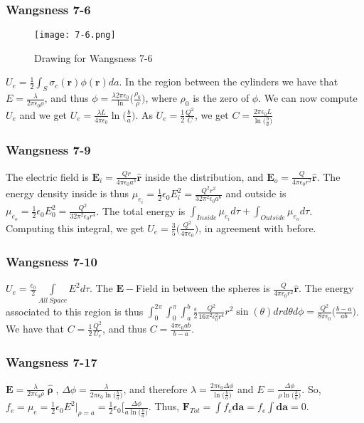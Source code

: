 \documentclass[crop=false,class=article,oneside]{standalone}
\begin{document}
        \subsubsection{Wangsness 7-6}
        \begin{figure}[htbp]
            \centering
            {\texttt{[image: 7-6.png]}}
            \caption{Drawing for Wangsness 7-6}
        \end{figure}
        $U_e = \frac{1}{2}\int_{S}\sigma_c(\mathbf{r})\phi(\mathbf{r})da$. In the region between the cylinders we have that $E = \frac{\lambda}{2\pi \epsilon_0 \rho}$, and thus $\phi= \frac{\lambda 2\pi \epsilon_0}\ln\big(\frac{\rho_0}{\rho}\big)$, where $\rho_0$ is the zero of $\phi$. We can now compute $U_e$ and we get $U_e = \frac{\lambda L}{4\pi \epsilon_0}\ln\big(\frac{b}{a}\big)$. As $U_e = \frac{1}{2}\frac{Q^2}{C}$, we get $C= \frac{2\pi \epsilon_0 L}{\ln\big(\frac{b}{a}\big)}$
        \subsubsection{Wangsness 7-9}
        The electric field is $\mathbf{E}_i = \frac{Qr}{4\pi \epsilon_0 a^3}\hat{\mathbf{r}}$ inside the distribution, and $\mathbf{E}_o = \frac{Q}{4\pi\epsilon_0r^2}\hat{\mathbf{r}}$. The energy density inside is thus $\mu_{e_i} = \frac{1}{2}\epsilon_0 E_i^2=\frac{Q^2r^2}{32\pi^2 \epsilon_0 a^6}$ and outside is $\mu_{e_o} = \frac{1}{2}\epsilon_0 E_0^2 = \frac{Q^2}{32\pi^2 \epsilon_0 r^4}$. The total energy is $\int_{Inside} \mu_{e_i}d\tau + \int_{Outside} \mu_{e_o}d\tau$. Computing this integral, we get $U_e = \frac{3}{5}\bigg( \frac{Q^2}{4\pi \epsilon_0}\bigg)$, in agreement with before.
        \subsubsection{Wangsness 7-10}
        $U_e = \frac{\epsilon_0}{2} \underset{All\ Space}\int E^2 d\tau$. The $\mathbf{E}-$Field in between the spheres is $\frac{Q}{4\pi \epsilon_0 r^2}\hat{\mathbf{r}}$. The energy associated to this region is thus $\int_{0}^{2\pi}\int_{0}^{\pi}\int_{a}^{b} \frac{\epsilon}{2} \frac{Q^2}{16\pi^2 \epsilon_0^2 r^4}r^2\sin(\theta) dr d\theta d\phi = \frac{Q^2}{8\pi \epsilon_0}\bigg(\frac{b-a}{ab}\bigg)$. We have that $C = \frac{1}{2} \frac{Q^2}{U_e}$, and thus $C = \frac{4\pi \epsilon_0 ab}{b-a}$.
        \subsubsection{Wangsness 7-17}
        $\mathbf{E} = \frac{\lambda}{2\pi \epsilon_0 \rho}\hat{\boldsymbol{\uprho}}$, $\Delta\phi = \frac{\lambda}{2\pi \epsilon_0 \ln\big(\frac{b}{a}\big)}$, and therefore $\lambda = \frac{2\pi \epsilon_0 \Delta\phi}{\ln\big(\frac{b}{a}\big)}$ and $E = \frac{\Delta \phi}{\rho \ln\big(\frac{b}{a}\big)}$. So, $f_e = \mu_e = \frac{1}{2} \epsilon_0 E^2\bigg|_{\rho = a} = \frac{1}{2} \epsilon_0 \bigg[ \frac{\Delta\phi}{a \ln\big(\frac{b}{a}\big)}$. Thus, $\mathbf{F}_{Tot} = \int f_e \mathbf{da} = f_e \int \mathbf{da} = 0$.
\end{document}
